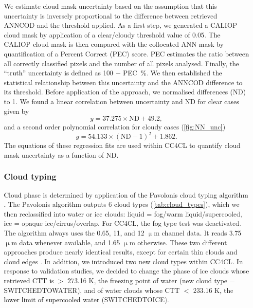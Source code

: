 We estimate cloud mask uncertainty based on the assumption that this uncertainty is inversely proportional to the difference between retrieved ANNCOD and the threshold applied. As a first step, we generated a CALIOP cloud mask by application of a clear/cloudy threshold value of 0.05. The CALIOP cloud mask is then compared with the collocated ANN mask by quantification of a Percent Correct (PEC) score. PEC estimates the ratio between all correctly classified pixels and the number of all pixels analysed. Finally, the ``truth'' uncertainty is defined as 100 $-$ PEC~\%. We then established the statistical relationship between this uncertainty and the ANNCOD difference to its threshold. Before application of the approach, we normalised differences (ND) to 1. We found a linear correlation between uncertainty and ND for clear cases given by 
\begin{equation}
  y = 37.275 \times \mathrm{ND} + 49.2,
\end{equation}
and a second order polynomial correlation for cloudy cases (\autoref{fig:NN_unc})
\begin{equation}
  y = 54.133 \times (\mathrm{ND}-1)^2 + 1.862.
\end{equation}
The equations of these regression fits are used within CC4CL to quantify cloud mask uncertainty as a function of ND.

\subsubsection{Cloud typing}\label{sec:Pavolonis}

Cloud phase is determined by application of the Pavolonis cloud typing algorithm \citep{Pavolonis05}. The Pavolonis algorithm outputs 6 cloud types (\cref{tab:cloud_types}), which we then reclassified into water or ice clouds: liquid = fog/warm liquid/supercooled, ice = opaque ice/cirrus/overlap. For CC4CL, the fog type test was deactivated. The algorithm always uses the 0.65, 11, and 12 $\upmu$m channel data. It reads 3.75 $\upmu$m data whenever available, and 1.65 $\upmu$m otherwise. These two different approaches produce nearly identical results, except for certain thin clouds and cloud edges \citep{Pavolonis05}. In addition, we introduced two new cloud types within CC4CL. In response to validation studies, we decided to change the phase of ice clouds whose retrieved CTT is $>$ 273.16 K, the freezing point of water (new cloud type = SWITCHED\textunderscore TO\textunderscore WATER), and of water clouds whose CTT $<$ 233.16 K, the lower limit of supercooled water (SWITCHED\textunderscore TO\textunderscore ICE).


